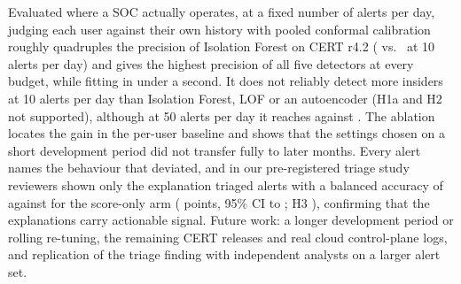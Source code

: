 Evaluated where a SOC actually operates, at a fixed number of alerts per day, judging each user
against their own history with pooled conformal calibration roughly quadruples the precision of
Isolation Forest on CERT r4.2 (\POursBA{} vs.\ \PIFBA{} at 10 alerts per day) and gives the highest
precision of all five detectors at every budget, while fitting in under a second. It does not
reliably detect more insiders at 10 alerts per day than Isolation Forest, LOF or an autoencoder
(H1a and H2 not supported), although at 50 alerts per day it reaches \DROursBB{} against \DRIFBB{}.
The ablation locates the gain in the per-user baseline and shows that the settings chosen on a
short development period did not transfer fully to later months. Every alert names the behaviour
that deviated, and in our pre-registered triage study reviewers shown only the explanation triaged
alerts with a balanced accuracy of \TriageBAB{} against \TriageBAA{} for the score-only arm
(\TriageDiff{} points, 95\% CI \TriageLo{} to \TriageHi{}; H3 \TriageVerdict{}), confirming that
the explanations carry actionable signal. Future work: a longer development period or rolling
re-tuning, the remaining CERT releases and real cloud control-plane logs, and replication of the
triage finding with independent analysts on a larger alert set.
